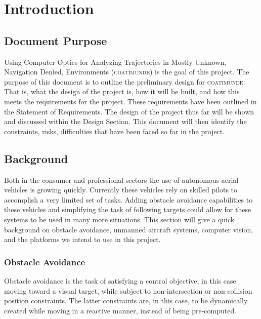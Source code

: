 \documentclass{article}
\begin{document}

\tableofcontents
\newpage

\section{Introduction}

	\subsection{Document Purpose}
	
	Using Computer Optics for Analyzing Trajectories in Mostly Unknown, Navigation Denied, Environments (\textsc{coatimunde}) is the goal of this project. The purpose of this document is to outline the preliminary design for \textsc{coatimunde}. That is, what the design of the project is, how it will be built, and how this meets the requirements for the project. These requirements have been outlined in the Statement of Requirements. The design of the project thus far will be shown and discussed within the Design Section. This document will then identify the constraints, risks, difficulties that have been faced so far in the project.
	
	\subsection{Background}
	
	Both in the consumer and professional sectors the use of autonomous aerial vehicles is growing quickly. Currently these vehicles rely on skilled pilots to accomplish a very limited set of tasks. Adding obstacle avoidance capabilities to these vehicles and simplifying the task of following targets could allow for these systems to be used in many more situations. This section will give a quick background on obstacle avoidance, unmanned aircraft systems, computer vision, and the platforms we intend to use in this project.
	
		\subsubsection{Obstacle Avoidance}
		
		
		Obstacle avoidance is the task of satisfying a control objective, in this case moving toward a visual target, while subject to non-intersection or non-collision position constraints. The latter constraints are, in this case, to be dynamically created while moving in a reactive manner, instead of being pre-computed.
		
\end{document}
